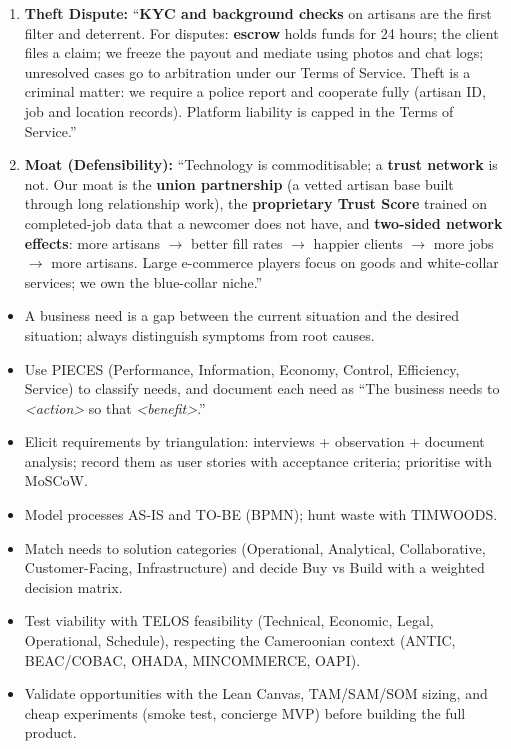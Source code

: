 \documentclass[11pt]{article}
\newcommand{\cle}[1]{{\popxbold\color{popdark}#1}}
\begin{document}
\begin{exoresolu}
\begin{enumerate}
    \item \textbf{Theft Dispute:} ``\textbf{KYC and background checks} on artisans are the first filter and deterrent. For disputes: \textbf{escrow} holds funds for 24 hours; the client files a claim; we freeze the payout and mediate using photos and chat logs; unresolved cases go to arbitration under our Terms of Service. Theft is a criminal matter: we require a police report and cooperate fully (artisan ID, job and location records). Platform liability is capped in the Terms of Service.''
    \item \textbf{Moat (Defensibility):} ``Technology is commoditisable; a \textbf{trust network} is not. Our moat is the \textbf{union partnership} (a vetted artisan base built through long relationship work), the \textbf{proprietary Trust Score} trained on completed-job data that a newcomer does not have, and \textbf{two-sided network effects}: more artisans $\to$ better fill rates $\to$ happier clients $\to$ more jobs $\to$ more artisans. Large e-commerce players focus on goods and white-collar services; we own the blue-collar niche.''
\end{enumerate}
\end{exoresolu}

\begin{aretenir}
\begin{itemize}
    \item A \cle{business need} is a gap between the current situation and the desired situation; always distinguish \cle{symptoms} from \cle{root causes}.
    \item Use \cle{PIECES} (Performance, Information, Economy, Control, Efficiency, Service) to classify needs, and document each need as ``The business needs to \emph{<action>} so that \emph{<benefit>}.''
    \item Elicit requirements by \cle{triangulation}: interviews + observation + document analysis; record them as \cle{user stories} with acceptance criteria; prioritise with \cle{MoSCoW}.
    \item Model processes \cle{AS-IS} and \cle{TO-BE} (BPMN); hunt waste with \cle{TIMWOODS}.
    \item Match needs to solution categories (Operational, Analytical, Collaborative, Customer-Facing, Infrastructure) and decide Buy vs Build with a \cle{weighted decision matrix}.
    \item Test viability with \cle{TELOS} feasibility (Technical, Economic, Legal, Operational, Schedule), respecting the Cameroonian context (ANTIC, BEAC/COBAC, OHADA, MINCOMMERCE, OAPI).
    \item Validate opportunities with the \cle{Lean Canvas}, \cle{TAM/SAM/SOM} sizing, and cheap experiments (smoke test, concierge MVP) before building the full product.
\end{itemize}
\end{aretenir}
\end{document}
